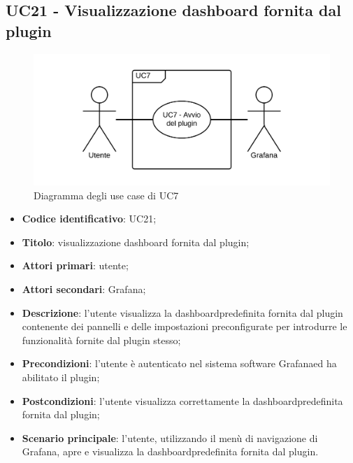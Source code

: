 \subsection{UC21 - Visualizzazione dashboard fornita dal plugin}
\begin{figure}[H]
	\includegraphics{img/UC7_-_Avvio_plugin.png}
	\caption{Diagramma degli use case di UC7}
\end{figure}
\begin{itemize}
	\item \textbf{Codice identificativo}: UC21;
	\item \textbf{Titolo}: visualizzazione dashboard fornita dal plugin;
	\item \textbf{Attori primari}: utente;
	\item \textbf{Attori secondari}: Grafana\glo;
	\item \textbf{Descrizione}: l'utente visualizza la dashboard\glosp predefinita fornita dal plugin contenente dei pannelli e delle impostazioni preconfigurate per introdurre le funzionalità fornite dal plugin stesso;
	\item \textbf{Precondizioni}: l'utente è autenticato nel sistema software Grafana\glosp ed ha abilitato il plugin;
	\item \textbf{Postcondizioni}: l'utente visualizza correttamente la dashboard\glosp predefinita fornita dal plugin;
	\item \textbf{Scenario principale}: l'utente, utilizzando il menù di navigazione di Grafana\glo, apre e visualizza la dashboard\glosp predefinita fornita dal plugin.
\end{itemize} 
